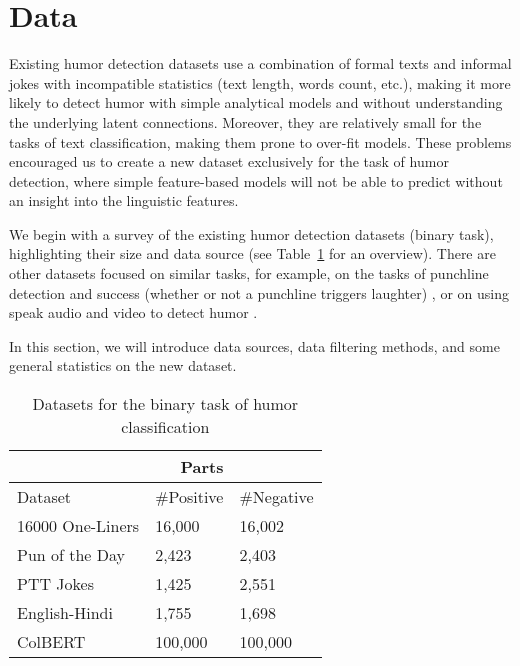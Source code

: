 \documentclass[journal]{IEEEtran}
\begin{document}
\section{Data}

Existing humor detection datasets use a combination of formal texts and informal jokes with incompatible statistics (text length, words count, etc.), making it more likely to detect humor with simple analytical models and without understanding the underlying latent connections. Moreover, they are relatively small for the tasks of text classification, making them prone to over-fit models. These problems encouraged us to create a new dataset exclusively for the task of humor detection, where simple feature-based models will not be able to predict without an insight into the linguistic features.

We begin with a survey of the existing humor detection datasets (binary task), highlighting their size and data source (see Table~\ref{table-1} for an overview). There are other datasets focused on similar tasks, for example, on the tasks of punchline detection and  success (whether or not a punchline triggers laughter) \cite{chen2017predicting,hasan2019ur}, or on using speak audio and video to detect humor \cite{bertero2016deep,hasan2019ur}. 

In this section, we will introduce data sources, data filtering methods, and some general statistics on the new dataset.

\begin{table}
  \caption{Datasets for the binary task of humor classification}
  \label{table-1}
  \centering
  \begin{tabular}{l|ll}
    \hline
    \multicolumn{2}{r}{Parts}                   \\ \hline
     Dataset     &   \#Positive  &  \#Negative \\ \hline
    16000 One-Liners \cite{mihalcea2005making} & 16,000   &	16,002     \\
    Pun of the Day \cite{yang2015humor}     & 2,423  &	2,403      \\
    PTT Jokes \cite{chen2018humor}     &     1,425	&   2,551  \\
    English-Hindi \cite{khandelwal2018humor}     & 1,755	&   1,698  \\ \hline
    ColBERT     &       100,000	&   100,000  \\ \hline
  \end{tabular}
\end{table}
\end{document}
